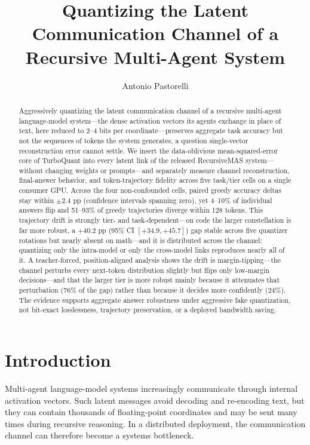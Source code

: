 \documentclass{article}
\title{Quantizing the Latent Communication Channel of a Recursive Multi-Agent System}
\author{Antonio Pastorelli}
\date{}
\begin{document}
\maketitle

\begin{abstract}
Aggressively quantizing the latent communication channel of a recursive multi-agent
language-model system---the dense activation vectors its agents exchange in place of text, here
reduced to 2--4 bits per coordinate---preserves aggregate task accuracy but not the sequences of
tokens the system generates, a question single-vector reconstruction error cannot settle. We
insert the data-oblivious mean-squared-error core of TurboQuant into every latent link of the
released RecursiveMAS system---without changing weights or prompts---and separately measure
channel reconstruction, final-answer behavior, and token-trajectory fidelity across five task/tier
cells on a single consumer GPU. Across the four non-confounded cells, paired greedy accuracy
deltas stay within $\pm2.4$ pp (confidence intervals spanning zero), yet 4--10\% of individual
answers flip and 51--93\% of greedy trajectories diverge within 128 tokens. This trajectory drift
is strongly tier- and task-dependent---on code the larger constellation is far more robust, a
$+40.2$ pp (95\% CI $[+34.9,+45.7]$) gap stable across five quantizer rotations but nearly absent
on math---and it is distributed across the channel: quantizing only the intra-model or only the
cross-model links reproduces nearly all of it. A teacher-forced, position-aligned analysis shows
the drift is margin-tipping---the channel perturbs every next-token distribution slightly but flips
only low-margin decisions---and that the larger tier is more robust mainly because it attenuates
that perturbation ($76\%$ of the gap) rather than because it decides more confidently ($24\%$). The
evidence supports aggregate answer robustness under aggressive fake quantization, not bit-exact
losslessness, trajectory preservation, or a deployed bandwidth saving.
\end{abstract}

\section{Introduction}

Multi-agent language-model systems increasingly communicate through internal
activation vectors. Such latent messages avoid decoding and re-encoding text, but
they can contain thousands of floating-point coordinates and may be sent many times
during recursive reasoning. In a distributed deployment, the communication channel
can therefore become a systems bottleneck.
\end{document}

